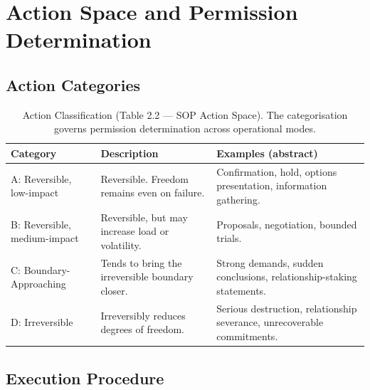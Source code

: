 
\section{Action Space and Permission Determination}
\label{sec:action-space-permission-c2}

\subsection{Action Categories}
\label{sec:action-categories-c2}

\begin{table}[ht]
\centering
\small
\begin{tabularx}{\linewidth}{lXX}
\toprule
\textbf{Category} & \textbf{Description} & \textbf{Examples (abstract)} \\
\midrule
A: Reversible, low-impact
& Reversible. Freedom remains even on failure.
& Confirmation, hold, options presentation, information gathering. \\

B: Reversible, medium-impact
& Reversible, but may increase load or volatility.
& Proposals, negotiation, bounded trials. \\

C: Boundary-Approaching
& Tends to bring the irreversible boundary closer.
& Strong demands, sudden conclusions, relationship-staking
statements. \\

D: Irreversible
& Irreversibly reduces degrees of freedom.
& Serious destruction, relationship severance, unrecoverable
commitments. \\
\bottomrule
\end{tabularx}
\caption[Action Classification]{Action Classification
(Table 2.2 --- SOP Action Space). The categorisation governs
permission determination across operational modes.}
\label{tab:action-classification-c2}
\end{table}

\subsection{Execution Procedure}
\label{sec:action-space-execution}


